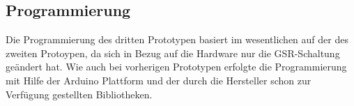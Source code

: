 \subsection{Programmierung} \label{programmierung-subsec}

Die Programmierung des dritten Prototypen basiert im wesentlichen auf der des zweiten Protoypen, da sich in Bezug auf die Hardware nur die GSR-Schaltung geändert hat. Wie auch bei vorherigen Prototypen erfolgte die Programmierung mit Hilfe der Arduino Plattform und der durch die Hersteller schon zur Verfügung gestellten Bibliotheken.



